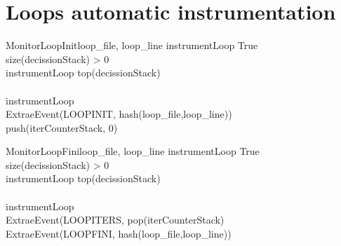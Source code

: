 \chapter{Loops automatic instrumentation}\label{ann:iterations_sampling}

\begin{pseudocode}{MonitorLoopInit}{loop_{file}, loop_{line}}
\label{pc:mercurium_monitor_loop_init}
    instrumentLoop \GETS True\\
    \IF size(decissionStack) > 0 \THEN
    \BEGIN
      \\
      instrumentLoop \GETS top(decissionStack)\\
    \END\\
    \IF instrumentLoop \THEN
    \BEGIN
      \\
        ExtraeEvent(LOOPINIT, hash(loop_{file},loop_{line}))\\
        push(iterCounterStack, 0)\\
    \END
\end{pseudocode}

\begin{pseudocode}{MonitorLoopFini}{loop_{file}, loop_{line}}
\label{pc:mercurium_monitor_loop_fini}
    instrumentLoop \GETS True\\
    \IF size(decissionStack) > 0 \THEN
    \BEGIN
      \\
      instrumentLoop \GETS top(decissionStack)\\
    \END\\
    \IF instrumentLoop \THEN
    \BEGIN
      \\
        ExtraeEvent(LOOPITERS, pop(iterCounterStack)\\
        ExtraeEvent(LOOPFINI, hash(loop_{file},loop_{line}))\\
    \END
\end{pseudocode}

